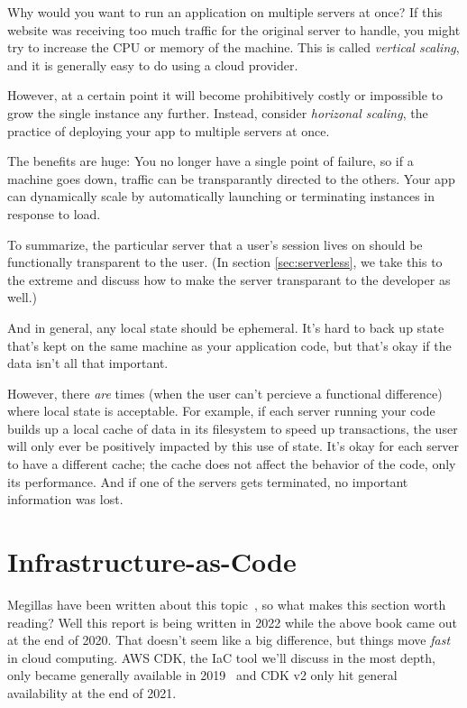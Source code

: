 \documentclass{article}
\newcommand{\infobox}[2]{
  \begin{tcolorbox}[width=\textwidth,colback={white},title={\strut\textbf{#1}},colbacktitle=blue!15,coltitle=black,boxrule=0.2pt,parbox=false]
    #2
  \end{tcolorbox}
}
\newcommand{\noterm}[1]{\textit{#1}}
\newcommand{\term}[1]{\noterm{#1}\index{#1}}
\begin{document}
\infobox{Horizonal scaling}{
  Why would you want to run an application on multiple servers at once?
  If this website was receiving too much traffic for the original server to handle, you might try to increase the CPU or memory of the machine.
  This is called \term{vertical scaling}, and it is generally easy to do using a cloud provider.

  However, at a certain point it will become prohibitively costly or impossible to grow the single instance any further.
  Instead, consider \term{horizonal scaling}, the practice of deploying your app to multiple servers at once.

  The benefits are huge:
  You no longer have a single point of failure, so if a machine goes down, traffic can be transparantly directed to the others.
  Your app can dynamically scale by automatically launching or terminating instances in response to load.
}

To summarize, the particular server that a user's session lives on should be functionally transparent to the user.
(In section \ref{sec:serverless}, we take this to the extreme and discuss how to make the server transparant to the developer as well.)

And in general, any local state should be ephemeral.
It's hard to back up state that's kept on the same machine as your application code, but that's okay if the data isn't all that important.

However, there \textit{are} times (when the user can't percieve a functional difference) where local state is acceptable.
For example, if each server running your code builds up a local cache of data in its filesystem to speed up transactions, the user will only ever be positively impacted by this use of state.
It's okay for each server to have a different cache; the cache does not affect the behavior of the code, only its performance.
And if one of the servers gets terminated, no important information was lost.

\section{Infrastructure-as-Code}
\label{IAC}

Megillas have been written about this topic~\cite{iac-book}, so what makes this section worth reading?
Well this report is being written in 2022 while the above book came out at the end of 2020.
That doesn't seem like a big difference, but things move \textit{fast} in cloud computing.
AWS CDK, the IaC tool we'll discuss in the most depth, only became generally available in 2019~\cite{cdk-1} and CDK v2 only hit general availability at the end of 2021.~\cite{cdk-2}
\end{document}
